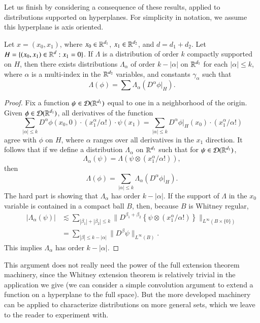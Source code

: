 Let us finish by considering a consequence of these results, applied to distributions supported on hyperplanes. For simplicity in notation, we assume this hyperplane is axis oriented.

\begin{theorem}
    Let $x = (x_0,x_1)$, where $x_0 \in \operatorname{\mathbb{R}}^{d_1}$, $x_1 \in \operatorname{\mathbb{R}}^{d_2}$, and $d = d_1 + d_2$. Let $H = \{ (x_0,x_1) \in \operatorname{\mathbb{R}}^d: x_1 = 0 \}$. If $\Lambda$ is a distribution of order $k$ compactly supported on $H$, then there exists distributions $\Lambda_\alpha$ of order $k - |\alpha|$ on $\operatorname{\mathbb{R}}^{d_1}$ for each $|\alpha| \leq k$, where $\alpha$ is a multi-index in the $\operatorname{\mathbb{R}}^{d_2}$ variables, and constants $\gamma_\alpha$ such that
    \[ \Lambda(\phi) = \sum \Lambda_\alpha(D^\alpha \phi |_H). \]
\end{theorem}
\begin{proof}
    Fix a function $\psi \in \operatorname{\mathcal{D}}(\operatorname{\mathbb{R}}^{d_1})$ equal to one in a neighborhood of the origin. Given $\phi \in \operatorname{\mathcal{D}}(\operatorname{\mathbb{R}}^{d_1})$, all derivatives of the function
    \[ \sum_{|\alpha| \leq k} D^\alpha \phi(x_0,0) \cdot (x_1^\alpha / \alpha!) \cdot \psi(x_1) = \sum_{|\alpha| \leq k} D^\alpha \phi |_H (x_0) \cdot (x_1^\alpha / \alpha!) \]
    agree with $\phi$ on $H$, where $\alpha$ ranges over all derivatives in the $x_1$ direction. It follows that if we define a distribution $\Lambda_\alpha$ on $\operatorname{\mathbb{R}}^{d_1}$ such that for $\psi \in \operatorname{\mathcal{D}}(\operatorname{\mathbb{R}}^{d_1})$,
    \[ \Lambda_\alpha(\psi) = \Lambda( \psi \otimes (x_1^\alpha / \alpha!)), \]
    then
    \[ \Lambda(\phi) = \sum_{|\alpha| \leq k} \Lambda_\alpha( D^\alpha \phi |_H ). \]
    The hard part is showing that $\Lambda_\alpha$ has order $k - |\alpha|$. If the support of $\Lambda$ in the $x_0$ variable is contained in a compact ball $B$, then, because $B$ is Whitney regular,
    \begin{align*}
        |\Lambda_\alpha(\psi)| &\lesssim \sum_{|\beta_1| + |\beta_2| \leq k} \| D^{\beta_1 + \beta_2} \left\{ \psi \otimes (x_1^\alpha / \alpha!) \right\} \|_{L^\infty(B \times \{ 0 \})}\\
        &= \sum_{|\beta| \leq k - |\alpha|} \| D^\beta \psi \|_{L^\infty(B)}.
    \end{align*}
    This implies $\Lambda_\alpha$ has order $k-|\alpha|$.
\end{proof}

\begin{remark}
    This argument does not really need the power of the full extension theorem machinery, since the Whitney extension theorem is relatively trivial in the application we give (we can consider a simple convolution argument to extend a function on a hyperplane to the full space). But the more developed machinery can be applied to characterize distributions on more general sets, which we leave to the reader to experiment with.
\end{remark}

